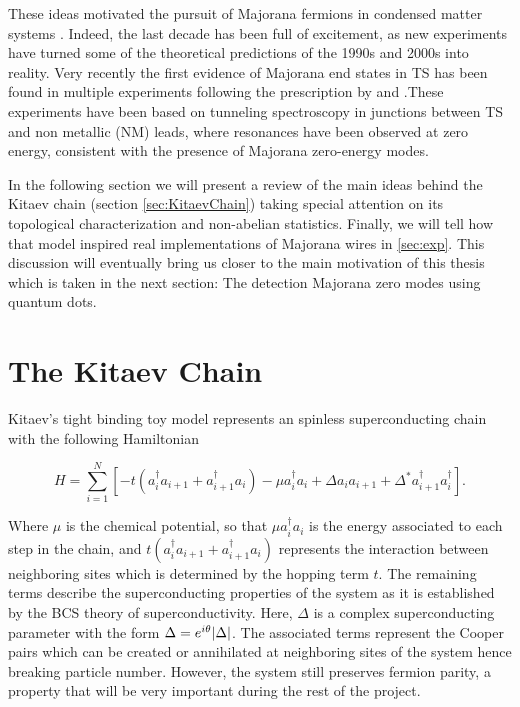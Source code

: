 These ideas motivated the pursuit of Majorana fermions in condensed matter systems \citep{fu_superconducting_2008,sato_non-abelian_2009,alicea_new_2012,beenakker_search_2013}. Indeed, the last decade has been full of excitement, as new experiments have turned some of the theoretical predictions of the 1990s and 2000s into reality. Very recently the first evidence of Majorana end states
in TS has been found in multiple experiments \citep{mourik_signatures_2012,das_zero-bias_2012,deng_anomalous_2012,deng_majorana_2016,zhang_quantized_2018}
following the prescription by \citet{oreg_helical_2010} and \citet{lutchyn_majorana_2010}.These experiments have been based on tunneling spectroscopy in junctions between TS and non metallic (NM) leads, where resonances have been
observed at zero energy, consistent with the presence of Majorana zero-energy modes.

In the following section we will present a review of the main ideas behind the Kitaev chain (section \ref{sec:KitaevChain}) taking special attention on its topological characterization and non-abelian statistics. Finally, we will tell how that model inspired real implementations of Majorana wires in \ref{sec:exp}. This discussion will eventually bring us closer  to the main motivation of this thesis which is taken in the next section: The detection Majorana zero modes using quantum dots. 







\section{The Kitaev Chain \label{sec:KitaevChain}}

Kitaev's tight binding toy model  represents an spinless superconducting chain with the following Hamiltonian

\begin{equation}
H = \sum_{i=1}^N \left[ -t(a_i^{\dagger} a_{i+1} + a_{i+1}^{\dagger}a_i) -\mu a_i^{\dagger} a_{i} +  \Delta a_{i}a_{i+1} + \Delta^* a_{i+1}^{\dagger}a_i^{\dagger} \right].  \label{eq:kitaevHam}
\end{equation}



\noindent Where $\mu$ is the chemical potential, so that $\mu a_i^{\dagger} a_{i}$ is the energy associated to each step in the chain, and $t(a_i^{\dagger} a_{i+1} + a_{i+1}^{\dagger}a_i)$ represents the interaction between neighboring sites which is determined by the hopping term $t$. The remaining terms describe the superconducting properties of the system as it is established by the BCS theory of superconductivity. Here, $\Delta$ is a complex superconducting parameter with the form  $\Delta = e^{i\theta} \vert \Delta \vert$. The associated terms represent the Cooper pairs which can be created or annihilated at neighboring sites of the system hence breaking particle number. However, the system still preserves fermion parity, a property that will be very important during the rest of the project. 

